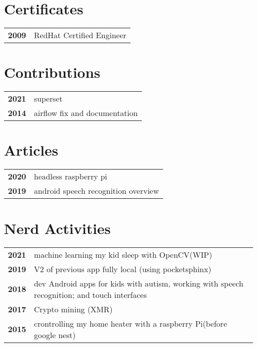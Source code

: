 \documentclass[bluebeige]{hipstercv}
\begin{document}
\begin{paracol}{2}
\begin{minipage}[t]{0.16\textwidth}
 \hspace{1em}
\end{minipage}

\vspace{3em}

\begin{minipage}[t]{0.3\textwidth}
\section*{Certificates}
\begin{tabular}{>{\footnotesize\bfseries}r >{\footnotesize}p{}}
    2009 & RedHat Certified Engineer
\end{tabular}

\section*{Contributions}
\begin{tabular}{>{\footnotesize\bfseries}r >{\footnotesize}p{}}
	2021 & superset\\
	2014 & airflow fix and documentation
\end{tabular}

\section*{Articles}
\begin{tabular}{>{\footnotesize\bfseries}r >{\footnotesize}p{}}
	2020 & headless raspberry pi\\
	2019 & android speech recognition overview
\end{tabular}

\end{minipage}\hfill
\begin{minipage}[t]{0.3\textwidth}
\section*{Nerd Activities}
\begin{tabular}{>{\footnotesize\bfseries}r >{\footnotesize}p{}}
	2021 & machine learning my kid sleep with OpenCV(WIP)\\
	2019 & V2 of previous app fully local (using pocketsphinx)\\
    2018 & dev Android apps for kids with autism, working with speech recognition; and touch interfaces\\
	2017 & Crypto mining (XMR)\\
	2015 & crontrolling my home heater with a raspberry Pi(before google nest)
\end{tabular}


\end{minipage}
\end{paracol}
\end{document}
